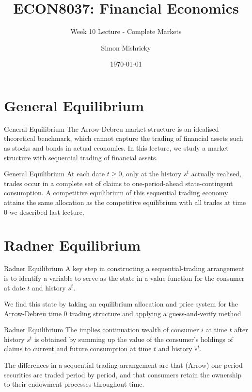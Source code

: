 \documentclass[aspectratio=169,xcolor=dvipsnames]{beamer}
\title{ECON8037: Financial Economics}
\subtitle{\normalsize Week 10 Lecture - Complete Markets}
\author{Simon Mishricky}
\institute{Research School of Economics, Australian National University}
\date{\today}
\begin{document}
\section{General Equilibrium}
\frame{\titlepage}

\begin{frame}{General Equilibrium}
    The Arrow-Debreu market structure is an idealised theoretical benchmark, which cannot capture the trading of financial assets such as stocks and bonds in actual economies. In this lecture, we study a market structure with sequential trading of financial assets.
\end{frame}

\begin{frame}{General Equilibrium}
    At each date $t \ge 0$, only at the history $s^t$ actually realised, trades occur in a complete set of claims to one-period-ahead state-contingent consumption. A competitive equilibrium of this sequential trading economy attains the same allocation as the competitive equilibrium with all trades at time 0 we described last lecture.
\end{frame}

\section{Radner Equilibrium}

\begin{frame}{Radner Equilibrium}
    A key step in constructing a sequential-trading arrangement is to identify a variable to serve as the state in a value function for the consumer at date $t$ and history $s^t$.

    We find this state by taking an equilibrium allocation and price system for the Arrow-Debreu time 0 trading structure and applying a guess-and-verify method.
\end{frame}

\begin{frame}{Radner Equilibrium}
    The implies continuation wealth of consumer $i$ at time $t$ after history $s^t$ is obtained by summing up the value of the consumer's holdings of claims to current and future consumption at time $t$ and history $s^t$.

    The differences in a sequential-trading arrangement are that (Arrow) one-period securities are traded period by period, and that consumers retain the ownership to their endowment processes throughout time.
\end{frame}
\end{document}
